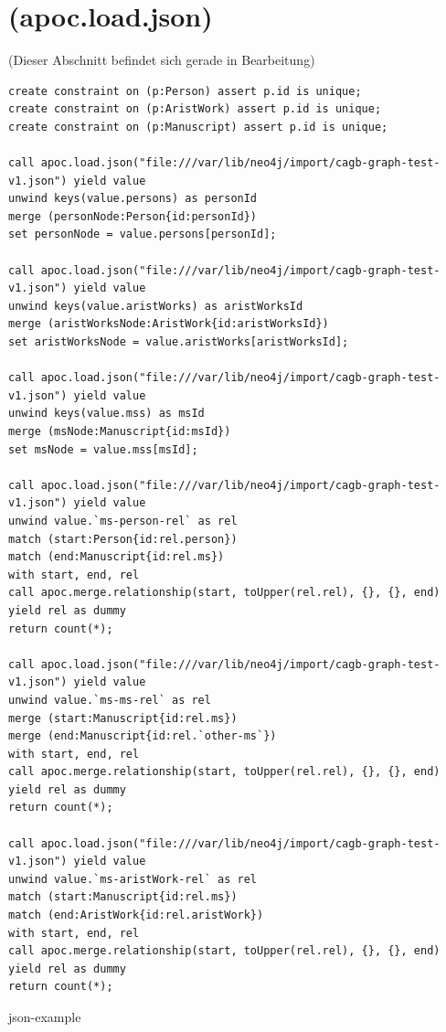 \documentclass[ngerman,]{scrreprt}
\begin{document}
\section{(apoc.load.json)}\label{apoc.load.json}

(Dieser Abschnitt befindet sich gerade in Bearbeitung)

\begin{verbatim}
create constraint on (p:Person) assert p.id is unique;
create constraint on (p:AristWork) assert p.id is unique;
create constraint on (p:Manuscript) assert p.id is unique;

call apoc.load.json("file:///var/lib/neo4j/import/cagb-graph-test-v1.json") yield value
unwind keys(value.persons) as personId
merge (personNode:Person{id:personId})
set personNode = value.persons[personId];

call apoc.load.json("file:///var/lib/neo4j/import/cagb-graph-test-v1.json") yield value
unwind keys(value.aristWorks) as aristWorksId
merge (aristWorksNode:AristWork{id:aristWorksId})
set aristWorksNode = value.aristWorks[aristWorksId];

call apoc.load.json("file:///var/lib/neo4j/import/cagb-graph-test-v1.json") yield value
unwind keys(value.mss) as msId
merge (msNode:Manuscript{id:msId})
set msNode = value.mss[msId];

call apoc.load.json("file:///var/lib/neo4j/import/cagb-graph-test-v1.json") yield value
unwind value.`ms-person-rel` as rel
match (start:Person{id:rel.person})
match (end:Manuscript{id:rel.ms})
with start, end, rel
call apoc.merge.relationship(start, toUpper(rel.rel), {}, {}, end) yield rel as dummy
return count(*);

call apoc.load.json("file:///var/lib/neo4j/import/cagb-graph-test-v1.json") yield value
unwind value.`ms-ms-rel` as rel
merge (start:Manuscript{id:rel.ms})
merge (end:Manuscript{id:rel.`other-ms`})
with start, end, rel
call apoc.merge.relationship(start, toUpper(rel.rel), {}, {}, end) yield rel as dummy
return count(*);

call apoc.load.json("file:///var/lib/neo4j/import/cagb-graph-test-v1.json") yield value
unwind value.`ms-aristWork-rel` as rel
match (start:Manuscript{id:rel.ms})
match (end:AristWork{id:rel.aristWork})
with start, end, rel
call apoc.merge.relationship(start, toUpper(rel.rel), {}, {}, end) yield rel as dummy
return count(*);
\end{verbatim}

json-example
\end{document}

